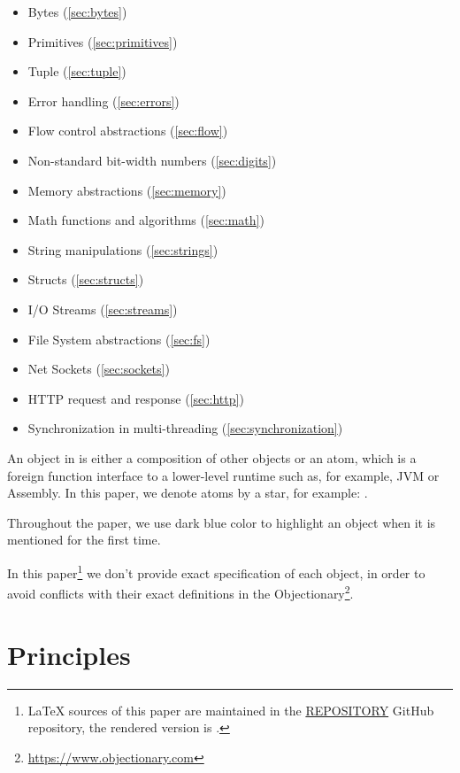 \documentclass[sigplan,nonacm]{acmart}
\newcommand\aff[1]{\ff{\textcolor{gray}{\(\star\)}#1}}
\begin{document}
\begin{itemize}
    \item Bytes (\cref{sec:bytes})
    \item Primitives (\cref{sec:primitives})
    \item Tuple (\cref{sec:tuple})
    \item Error handling (\cref{sec:errors})
    \item Flow control abstractions (\cref{sec:flow})
    \item Non-standard bit-width numbers (\cref{sec:digits})
    \item Memory abstractions (\cref{sec:memory})
    \item Math functions and algorithms (\cref{sec:math})
    \item String manipulations (\cref{sec:strings})
    \item Structs (\cref{sec:structs})
    \item I/O Streams (\cref{sec:streams})
    \item File System abstractions (\cref{sec:fs})
    \item Net Sockets (\cref{sec:sockets})
    \item HTTP request and response (\cref{sec:http})
    \item Synchronization in multi-threading (\cref{sec:synchronization})
\end{itemize}

An object in \eolang{} is either a composition of other objects or an atom, which is a
foreign function interface to a lower-level runtime such as, for example, JVM
or Assembly. In this paper, we denote atoms by a star, for example:
\aff{times}.

Throughout the paper, we use dark blue color to highlight an object when it is
mentioned for the first time.

In this paper\footnote{%
\LaTeX{} sources of this paper are maintained in the
\href{https://github.com/REPOSITORY}{REPOSITORY} GitHub repository,
the rendered version is \href{https://github.com/REPOSITORY/releases/tag/0.0.0}{}.}
we don't provide exact specification of each object, in order to avoid
conflicts with their exact definitions in the
Objectionary\footnote{\url{https://www.objectionary.com}}.

\section{Principles}
\end{document}
